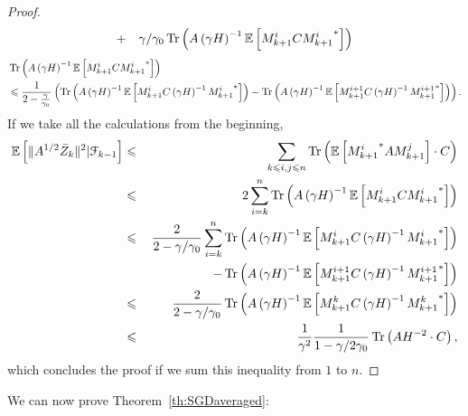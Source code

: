 \begin{proof}
\begin{eqnarray*}
& + & \gamma / \gamma_0 \operatorname{Tr}\left(A \left(\gamma H\right)^{-1} {\mathbb E} \left[  {M^{i}_{k+1}}C{M^{i}_{k+1}}^*\right]\right)
\end{eqnarray*}
\begin{align*}
&\operatorname{Tr}\left(A \left(\gamma H\right)^{-1} {\mathbb E} \left[  {M^{i}_{k+1}}C{M^{i}_{k+1}}^*\right]\right)\\ 
 &\leqslant \frac{1}{2-\frac{\gamma}{\gamma_0}} \left(\operatorname{Tr}\left(A \left(\gamma H\right)^{-1}{\mathbb E} \left[  {M^{i}_{k+1}}C\left(\gamma H\right)^{-1}{M^{i}_{k+1}}^*\right]\right) - \operatorname{Tr}\left(A \left(\gamma H\right)^{-1} {\mathbb E} \left[ {M^{i+1}_{k+1}}C\left(\gamma H\right)^{-1}{M^{i+1}_{k+1}}^*\right]\right)\right).
\end{align*}
If we take all the calculations from the beginning,
\begin{eqnarray*}
{\mathbb E} \left[ \|A^{1/2} \bar{Z}_k\|^2 | \mathcal{F}_{k-1} \right] & \leqslant & \sum_{k\leqslant i, j \leqslant n} \operatorname{Tr}\left( {\mathbb E} \left[  {M^i_{k+1}}^* A M^j_{k+1}\right] \cdot C\right) \\
& \leqslant & 2 \sum_{i=k}^n \operatorname{Tr}\left(A \left(\gamma H\right)^{-1} {\mathbb E} \left[  {M^{i}_{k+1}}C{M^{i}_{k+1}}^*\right]\right)\\
& \leqslant & \frac{2}{2-\gamma/\gamma_0} \sum_{i=k}^n \operatorname{Tr}\left(A \left(\gamma H\right)^{-1}{\mathbb E} \left[  {M^{i}_{k+1}}C\left(\gamma H\right)^{-1}{M^{i}_{k+1}}^*\right]\right) \\
& &   \hspace*{1.77cm} -\operatorname{Tr}\left(A \left(\gamma H\right)^{-1} {\mathbb E} \left[ {M^{i+1}_{k+1}}C\left(\gamma H\right)^{-1}{M^{i+1}_{k+1}}^*\right]\right)\\
& \leqslant & \frac{2}{2-\gamma/\gamma_0} \operatorname{Tr}\left(A \left(\gamma H\right)^{-1}{\mathbb E} \left[  {M^{k}_{k+1}}C\left(\gamma H\right)^{-1}{M^{k}_{k+1}}^*\right]\right)\\
& \leqslant & \frac{1}{\gamma^2}\frac{1}{1-\gamma/2\gamma_0} \operatorname{Tr} \left(A H^{-2}\cdot C \right),
\end{eqnarray*}
which concludes the proof if we sum this inequality from $1$ to $n$.

\end{proof}

We can now prove Theorem~\ref{th:SGDaveraged}:

